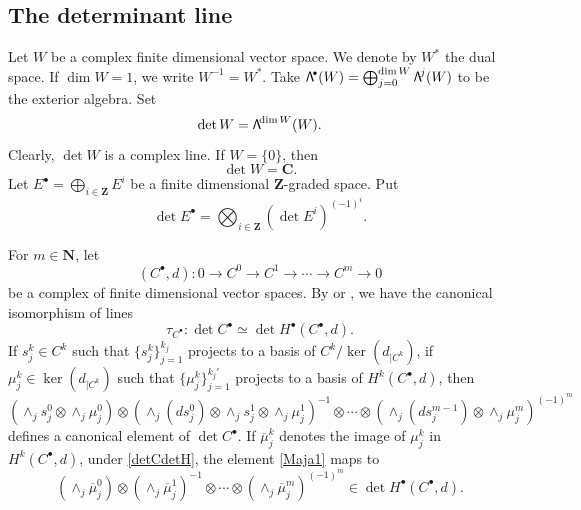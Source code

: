 \documentclass[11pt]{article}
\numberwithin{equation}{section}
\newcommand{\sbullet}{{\scriptscriptstyle\bullet}}
\newcommand\bw[1]{{\hbox{\large$\mathsf{\Lambda}$}^{\!#1}}}
\theoremstyle{plain}
\theoremstyle{definition}
\theoremstyle{remark}
\newcommand{\bN}{\mathbf{N}}
\newcommand{\bZ}{\mathbf{Z}}
\newcommand{\bC}{\mathbf{C}}
\let\ol\overline
\begin{document}
\subsection{The determinant line}\label{sDL}
Let $W$ be a complex finite dimensional vector space. We denote by
$W^*$ the dual space. If $\dim W=1$, we write $W^{-1}=W^{*}$. Take
$\bw\sbullet(W)=\bigoplus_{j=0}^{\dim W}\bw{j}(W)$ to be the exterior algebra. Set
\begin{equation*}
\det W =\bw{\dim W} (W).
\end{equation*}
Clearly, $\det W$ is a complex line. If $W=\{0\}$, then
\begin{equation*}
\det
W=\bC.
\end{equation*}
Let $E^{\sbullet}=\bigoplus_{i\in \bZ} E^{i}$ be a finite dimensional $\bZ$-graded
space. Put
\begin{equation*}
\det E^{\sbullet}= \bigotimes_{i\in \bZ} (\det E^{i})^{(-1)^{i}}.
\end{equation*}

For $m\in \bN$, let
\begin{equation*}
(C^{\sbullet},d): 0\to C^{0}\to C^{1}\to\cdots\to C^{m}\to 0
\end{equation*}
be a complex of finite dimensional vector
spaces. By \cite{KM76} or
\cite[(1.5)]{BGS1}, we
have the canonical isomorphism of lines
\begin{equation}\label{detCdetH}
\tau_{C^{\sbullet}}: \det C^{\sbullet}\simeq \det H^{\sbullet}(C^{\sbullet},d).
\end{equation}
If $s_{j}^{k}\in C^{k}$ such that $\{s_{j}^{k}\}_{j=1}^{k_{j}}$ projects to a basis of
$C^{k}/\ker (d_{|C^{k}})$, if $\mu_{j}^{k}\in \ker( d_{|C^{k}})$ such that
$\{\mu_{j}^{k}\}_{j=1}^{k_{j}'}$ projects to a basis of
$H^{k}(C^\sbullet,d)$,
then
\begin{equation}\label{Maja1}
(\wedge_{j} s^{0}_{j}\otimes \wedge_{j}\mu^{0}_{j})\otimes
(\wedge_{j} (ds^{0}_{j})\otimes
\wedge_{j}s^{1}_{j} \otimes \wedge_{j}\mu^{1}_{j})^{-1} \otimes\cdots \otimes(\wedge_{j}
(ds^{m-1}_{j})\otimes \wedge_{j}\mu^{m}_{j})^{(-1)^m}
\end{equation}
defines a canonical element of $\det C^\sbullet$.
If $\ol{\mu}_{j}^{k}$ denotes the image of $\mu_{j}^{k}$ in $H^{k}(C^{\sbullet},d)$, under
\eqref{detCdetH}, the element \eqref{Maja1} maps to
\begin{equation}\label{Maja11}
( \wedge_{j}\ol{\mu}^{0}_{j})\otimes
( \wedge_{j}\ol{\mu}^{1}_{j})^{-1} \otimes\cdots \otimes(
\wedge_{j}\ol{\mu}^{m}_{j})^{(-1)^m}\in \det
H^{\sbullet}(C^{\sbullet},d).
\end{equation}
\end{document}
